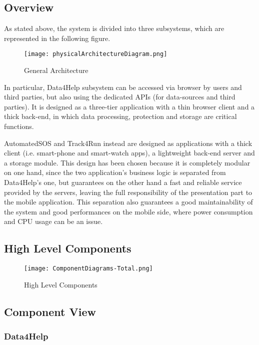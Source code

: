 \subsection{Overview}
As stated above, the system is divided into three subsystems, which are represented in the following figure.

\FloatBarrier

\begin{figure}[!h]
	\centering
	\texttt{[image: physicalArchitectureDiagram.png]}
	\caption{General Architecture}
\end{figure}


\FloatBarrier

In particular, Data4Help subsystem can be accessed via browser by users and third parties, but also using the dedicated APIs (for data-sources and third parties). It is designed as a three-tier application with a thin browser client and a thick back-end, in which data processing, protection and storage are critical functions.

AutomatedSOS and Track4Run instead are designed as applications with a thick client (i.e. smart-phone and smart-watch apps), a lightweight back-end server and a storage module. This design has been chosen because it is completely modular on one hand, since the two application's business logic is separated from Data4Help's one, but guarantees on the other hand a fast and reliable service provided by the servers, leaving the full responsibility of the presentation part to the mobile application. This separation also guarantees a good maintainability of the system and good performances on the mobile side, where power consumption and CPU usage can be an issue.

\subsection{High Level Components}

\FloatBarrier
\begin{figure}[!h]
	\centering
	\texttt{[image: ComponentDiagrams-Total.png]}
	\caption{High Level Components}
\end{figure}

\FloatBarrier

\subsection{Component View}
\subsubsection{Data4Help}

